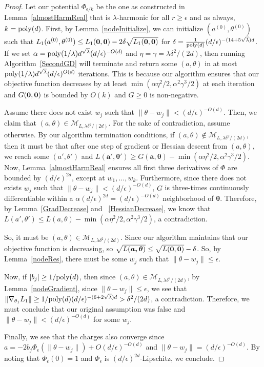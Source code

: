 \begin{proof}
Let our potential $\Phi_{\epsilon/k}$ be the one as constructed in Lemma~\ref{almostHarmReal} that is $\lambda$-harmonic for all $r \geq \epsilon$ and as always, $k = \mathrm{poly}(d)$. First, by Lemma~\ref{nodeInitialize},  we can initialize ${(a^{(0)},\theta^{(0)})}$ such that $L_1({a^{(0)},\theta^{(0)}}) \leq  L_1({\bf 0,0}) - 2\delta \sqrt{L_1({\bf 0,0})}$ for $ \delta = \frac{1}{\mathrm{poly}(d)}(d/\epsilon)^{ -(14+5\sqrt{\lambda})d}$. If we set $\alpha = \mathrm{poly}(1/\lambda)d^{\sqrt{\lambda}}(d/\epsilon)^{-O(d)}$ and $\eta = \gamma = \lambda \delta^2/(2d)$,  then running Algorithm~\ref{SecondGD} will terminate and return some $(a,\theta)$ in at most $\mathrm{poly}(1/\lambda)d^{\sqrt{\lambda}}(d/\epsilon)^{O(d)}$ iterations. This is because our algorithm ensures that our objective function decreases by at least $\min(\alpha \eta^2/2, \alpha^2\gamma^3/2)$ at each iteration and $G({\bf 0, 0})$ is bounded by $O(k)$ and $G \geq 0$ is non-negative.

Assume there does not exist $w_j$ such that $\|\theta - w_j\| < (d/\epsilon)^{-O(d)}$. Then, we claim that $(a,\theta) \in \mathcal{M}_{L,\lambda \delta^2/(2d)}$. For the sake of contradiction, assume otherwise. By our algorithm termination conditions, if $(a,\theta) \not\in \mathcal{M}_{L,\lambda \delta^2/(2d)}$, then it must be that after one step of gradient or Hessian descent from $(a,\theta)$, we reach some $(a',\theta')$ and $L(\boldsymbol{a',\theta'}) \geq G(\boldsymbol{a,\theta}) - \min(\alpha\eta^2/2,\alpha^2\gamma^3/2)$. Now, Lemma~\ref{almostHarmReal} ensures all first three derivatives of $\Phi$ are bounded by $(d/\epsilon)^{2d}$, except at $w_1,...,w_k$. Furthermore, since there does not exists $w_j$ such that $\|\theta - w_j\| < (d/\epsilon)^{-O(d)}$, $G$ is three-times continuously differentiable within a $\alpha (d/\epsilon)^{2d} = (d/\epsilon)^{-O(d)}$ neighborhood of $\boldsymbol{\theta}$. Therefore, by Lemma~\ref{GradDecrease} and ~\ref{HessianDecrease}, we know that $L(a',\theta') \leq L(a,\theta) - \min(\alpha\eta^2/2,\alpha^2\gamma^3/2)$, a contradiction. 

So, it must be $(a,\theta) \in \mathcal{M}_{L,\lambda \delta^2/(2d)}$. Since our algorithm maintains that our objective function is decreasing, so $\sqrt{L(\boldsymbol{a,\theta})} \leq \sqrt{L({\bf 0,0})} - \delta $. So, by Lemma~\ref{nodeRes}, there must be some $w_j$ such that $\|\theta- w_j\|\leq \epsilon$.

Now, if $|b_j| \geq 1/\mathrm{poly}(d)$, then since $(a,\theta) \in \mathcal{M}_{L,\lambda \delta^2/(2d)}$, by Lemma~\ref{nodeGradient}, since $\|\theta - w_j \| \leq \epsilon$, we see that $\|\nabla_{\theta_1}L_1 \| \geq 1/\mathrm{poly}(d)(d/\epsilon)^{-(6+2\sqrt{\lambda})d} > \delta^2/(2d)$, a contradiction. Therefore, we must conclude that our original assumption was false and $\|\theta - w_j\| < (d/\epsilon)^{-O(d)}$ for some $w_j$.

Finally, we see that the charges also converge since $a = -2b_j \Phi_\epsilon(\|\theta - w_j\|) + O(d/\epsilon)^{-O(d)}$ and $\|\theta - w_j\| = (d/\epsilon)^{-O(d)}$. By noting that $\Phi_\epsilon(0) = 1$ and $\Phi_\epsilon$ is $(d/\epsilon)^{2d}$-Lipschitz, we conclude. 
\end{proof}

